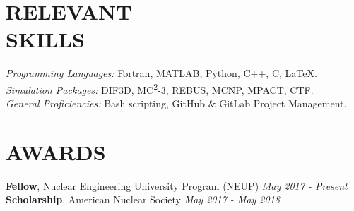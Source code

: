 \documentclass[margin, 10pt]{res}
\begin{document}
\begin{resume}

\section{RELEVANT \\ SKILLS}

{\sl Programming Languages:} Fortran, MATLAB, Python, C++, C, \LaTeX. \\
{\sl Simulation Packages:} DIF3D, MC\textsuperscript{2}-3, REBUS, MCNP, MPACT, 
  CTF. \\
{\sl General Proficiencies:} Bash scripting, GitHub \& GitLab Project 
  Management.

\section{AWARDS}
\textbf{Fellow}, Nuclear Engineering University Program (NEUP) \hfill 
  \textit{May 2017 - Present} \\
\textbf{Scholarship}, American Nuclear Society \hfill 
  \textit{May 2017 - May 2018}

\end{resume}
\end{document}
